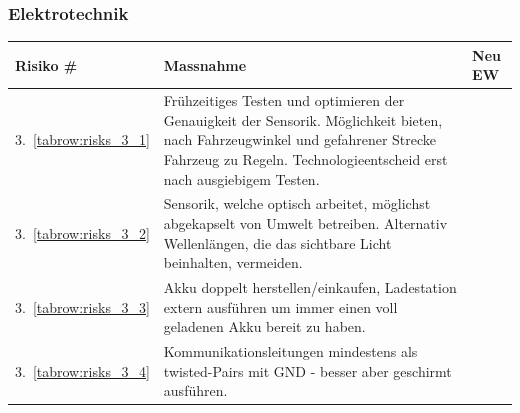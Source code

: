 \documentclass[main.tex]{subfiles} %
\begin{document}

\subsubsection*{Elektrotechnik}

\begin{table}[H]
    \begin{tabularx}{\textwidth}{|>{\centering\arraybackslash}p{2cm}|>{\raggedright\arraybackslash}X|>{\centering\arraybackslash}p{0.75cm}|}
        \hline
        \textbf{Risiko \#}        & \textbf{Massnahme}
                                  & \textbf{Neu EW}                                                                                                                                                                                        \\

        \hline
        \rowcolor{yellow!30}
        3.~\ref{tabrow:risks_3_1} & Frühzeitiges Testen und optimieren der Genauigkeit der Sensorik. Möglichkeit bieten, nach Fahrzeugwinkel und gefahrener Strecke Fahrzeug zu Regeln. Technologieentscheid erst nach ausgiebigem Testen.
                                  & 2                                                                                                                                                                                                      \\

        \hline
        \rowcolor{yellow!30}
        3.~\ref{tabrow:risks_3_2} & Sensorik, welche optisch arbeitet, möglichst abgekapselt von Umwelt betreiben. Alternativ Wellenlängen, die das sichtbare Licht beinhalten, vermeiden.
                                  & 3                                                                                                                                                                                                      \\

        \hline
        \rowcolor{green!30}
        3.~\ref{tabrow:risks_3_3} & Akku doppelt herstellen/einkaufen, Ladestation extern ausführen um immer einen voll geladenen Akku bereit zu haben.
                                  & 1                                                                                                                                                                                                      \\

        \hline
        \rowcolor{green!30}
        3.~\ref{tabrow:risks_3_4} & Kommunikationsleitungen mindestens als twisted-Pairs mit GND - besser aber geschirmt ausführen.
                                  & 1                                                                                                                                                                                                      \\


\end{tabularx}
\end{table}
\end{document}
